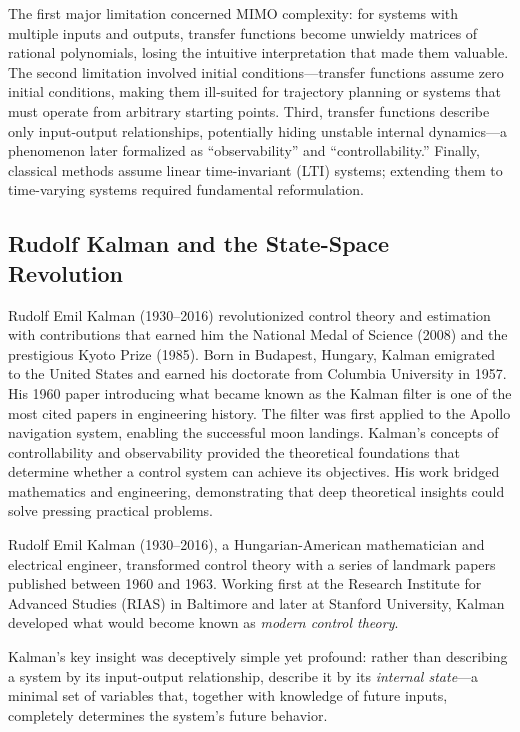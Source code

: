 The first major limitation concerned MIMO complexity: for systems with multiple inputs and outputs, transfer functions become unwieldy matrices of rational polynomials, losing the intuitive interpretation that made them valuable. The second limitation involved initial conditions---transfer functions assume zero initial conditions, making them ill-suited for trajectory planning or systems that must operate from arbitrary starting points. Third, transfer functions describe only input-output relationships, potentially hiding unstable internal dynamics---a phenomenon later formalized as ``observability'' and ``controllability.'' Finally, classical methods assume linear time-invariant (LTI) systems; extending them to time-varying systems required fundamental reformulation.

\subsection{Rudolf Kalman and the State-Space Revolution}

\begin{historicalbox}
Rudolf Emil Kalman (1930--2016) revolutionized control theory and estimation with contributions that earned him the National Medal of Science (2008) and the prestigious Kyoto Prize (1985). Born in Budapest, Hungary, Kalman emigrated to the United States and earned his doctorate from Columbia University in 1957. His 1960 paper introducing what became known as the Kalman filter is one of the most cited papers in engineering history. The filter was first applied to the Apollo navigation system, enabling the successful moon landings. Kalman's concepts of controllability and observability provided the theoretical foundations that determine whether a control system can achieve its objectives. His work bridged mathematics and engineering, demonstrating that deep theoretical insights could solve pressing practical problems.
\end{historicalbox}

Rudolf Emil Kalman (1930--2016), a Hungarian-American mathematician and electrical engineer, transformed control theory with a series of landmark papers published between 1960 and 1963. Working first at the Research Institute for Advanced Studies (RIAS) in Baltimore and later at Stanford University, Kalman developed what would become known as \textit{modern control theory}.

Kalman's key insight was deceptively simple yet profound: rather than describing a system by its input-output relationship, describe it by its \textit{internal state}---a minimal set of variables that, together with knowledge of future inputs, completely determines the system's future behavior.

